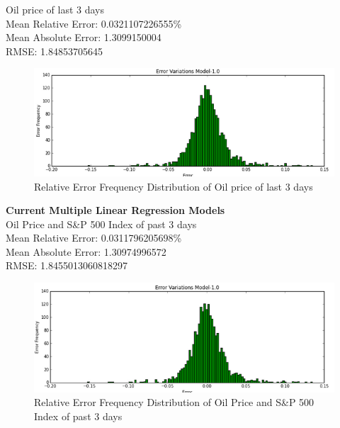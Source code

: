 \documentclass[runningheads]{llncs}
\begin{document}
\noindent Oil price of last 3 days \\
Mean Relative Error: 0.0321107226555\% \\
Mean Absolute Error:  1.3099150004 \\
RMSE:  1.84853705645 \\
\begin{figure}
\centering
\includegraphics[width=\textwidth]{OilLast3_Daily.png}
\caption{Relative Error Frequency Distribution of Oil price of last 3 days}
\label{fig:OilLast3_Daily.png}
\end{figure}

\noindent\textbf{Current Multiple Linear Regression Models} \\
Oil Price and S\&P 500 Index of past 3 days \\
Mean Relative Error: 0.0311796205698\% \\
Mean Absolute Error: 1.30974996572 \\
RMSE: 1.8455013060818297 \\
\begin{figure}
\centering
\includegraphics[width=\textwidth]{OilSP500_Daily.png}
\caption{Relative Error Frequency Distribution of Oil Price and S\&P 500 Index of past 3 days}
\label{fig:OilSP500_Daily.png}
\end{figure}
\end{document}

